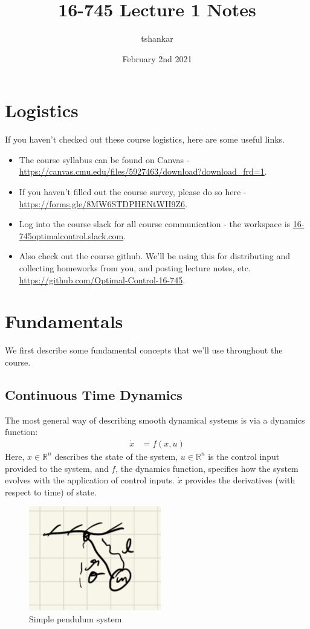 \documentclass{article}
\title{16-745 Lecture 1 Notes}
\author{tshankar}
\date{February 2nd 2021}
\begin{document}
\maketitle

\section{Logistics}
If you haven't checked out these course logistics, here are some useful links.
\begin{itemize}
    \item The course syllabus can be found on Canvas - \url{https://canvas.cmu.edu/files/5927463/download?download_frd=1}.
    \item If you haven't filled out the course survey, please do so here - \url{https://forms.gle/8MW6STDPHENtWH9Z6}. 
    \item Log into the course slack for all course communication - the workspace is \url{16-745optimalcontrol.slack.com}.
    \item Also check out the course github. We’ll be using this for distributing and collecting homeworks from you, and posting lecture notes, etc. \url{https://github.com/Optimal-Control-16-745}.
\end{itemize}

\section{Fundamentals}
We first describe some fundamental concepts that we'll use throughout the course. 

\subsection{Continuous Time Dynamics}
The most general way of describing smooth dynamical systems is via a dynamics function: 
\begin{align}
    \dot{x} &= f(x, u)
\end{align}
Here, $x \in \mathbb{R}^n$ describes the state of the system, $u \in \mathbb{R}^n$ is the control input provided to the system, and $f$, the dynamics function, specifies how the system evolves with the application of control inputs. 
$\dot{x}$ provides the derivatives (with respect to time) of state. \\

\begin{figure}
    \centering
    \includegraphics[]{L1_Images/F1.PNG}
    \caption{Simple pendulum system}
    \label{fig:f1}
\end{figure}
\end{document}
